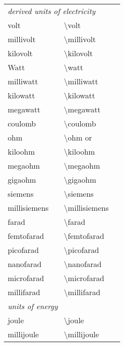 \begin{longtable}{Xl>{\ttfamily\textbackslash}Xl}
     \multicolumn{4}{l}{\emph{derived units of electricity}}\\[.5ex]
     volt             &\unitsignonly{\volt}             &volt&\\
     millivolt        &\unitsignonly{\millivolt}        &millivolt&\cmd{\mV}\\
     kilovolt         &\unitsignonly{\kilovolt}         &kilovolt&\cmd{\kv}\\
     Watt             &\unitsignonly{\watt}             &watt&\\
     milliwatt        &\unitsignonly{\milliwatt}        &milliwatt&\\
     kilowatt         &\unitsignonly{\kilowatt}         &kilowatt&\\
     megawatt         &\unitsignonly{\megawatt}         &megawatt&\\
     coulomb          &\unitsignonly{\coulomb}          &coulomb&\\
     ohm              &\unitsignonly{\ohm}&ohm \textrm{or} \cmd{\Ohm}&\\
     kiloohm          &\unitsignonly{\kiloohm}          &kiloohm&\\
     megaohm          &\unitsignonly{\megaohm}          &megaohm&\\
     gigaohm          &\unitsignonly{\gigaohm}          &gigaohm&\\
     siemens          &\unitsignonly{\siemens}          &siemens&\\
     millisiemens     &\unitsignonly{\millisiemens}     &millisiemens&\\
     farad            &\unitsignonly{\farad}            &farad&\\
     femtofarad       &\unitsignonly{\femtofarad}       &femtofarad&\\
     picofarad        &\unitsignonly{\picofarad}        &picofarad&\\
     nanofarad        &\unitsignonly{\nanofarad}        &nanofarad&\\
     microfarad       &\unitsignonly{\microfarad}       &microfarad&\\
     millifarad       &\unitsignonly{\millifarad}       &millifarad&\\[1ex]
     \multicolumn{4}{l}{\emph{units of energy}}\\[.5ex]
     joule            &\unitsignonly{\joule}            &joule&\\
     millijoule       &\unitsignonly{\millijoule}       &millijoule&\\

\end{longtable}
